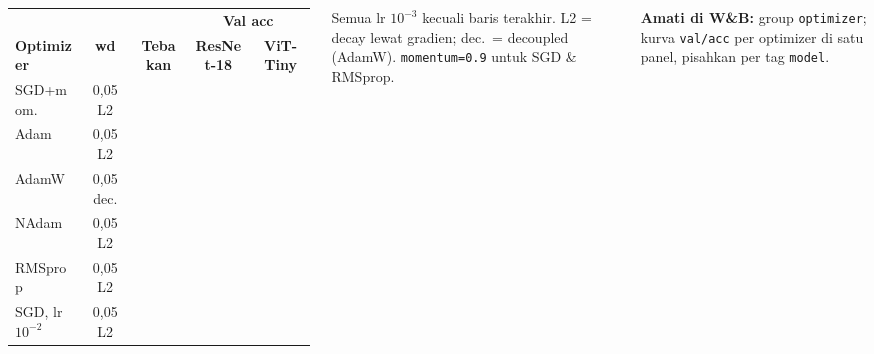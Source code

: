 \documentclass[t,aspectratio=169,xcolor={dvipsnames,table}]{beamer}
\begin{document}
\begin{frame}
\begin{columns}[T]
        \vspace{2pt}
        \scriptsize
        \setlength{\tabcolsep}{4pt}
        \renewcommand{\arraystretch}{1.4}
        \begin{tabular}{|l|c|c|c|c|}
            \rowcolor{dlSoftCloud} & & & \multicolumn{2}{c|}{\textbf{Val acc}} \\
            \rowcolor{dlSoftCloud} \textbf{Optimizer} & \textbf{wd} & \textbf{Tebakan} & \textbf{ResNet-18} & \textbf{ViT-Tiny} \\ \hline
            SGD+mom. & 0,05 L2 & \hspace{0.75cm} & \hspace{0.75cm} & \hspace{0.75cm} \\ \hline
            Adam & 0,05 L2 & \hspace{0.75cm} & \hspace{0.75cm} & \hspace{0.75cm} \\ \hline
            AdamW & 0,05 dec. & \hspace{0.75cm} & \hspace{0.75cm} & \hspace{0.75cm} \\ \hline
            NAdam & 0,05 L2 & \hspace{0.75cm} & \hspace{0.75cm} & \hspace{0.75cm} \\ \hline
            RMSprop & 0,05 L2 & \hspace{0.75cm} & \hspace{0.75cm} & \hspace{0.75cm} \\ \hline
            SGD, lr $10^{-2}$ & 0,05 L2 & \hspace{0.75cm} & \hspace{0.75cm} & \hspace{0.75cm} \\ \hline
        \end{tabular}

        \vspace{0.12cm}
        {\scriptsize Semua lr $10^{-3}$ kecuali baris terakhir. L2 = decay lewat gradien; dec.\ = decoupled (AdamW). \texttt{momentum=0.9} untuk SGD \& RMSprop.}

        \vspace{0.1cm}
        {\scriptsize\color{dlMute} \textbf{Amati di W\&B:} group \texttt{optimizer}; kurva \texttt{val/acc} per optimizer di satu panel, pisahkan per tag \texttt{model}.}
    \end{columns}
\end{frame}
\end{document}
